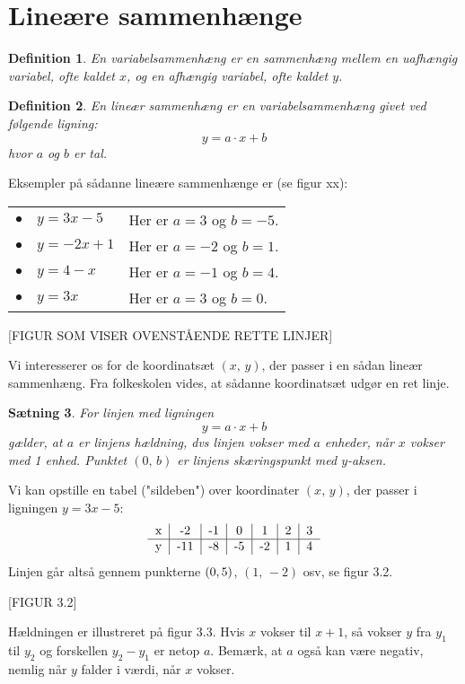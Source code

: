 \documentclass[12pt,oneside,a4paper]{article}
\newtheorem{thm}{Sætning}[section]
\newtheorem{mydef}[thm]{Definition}
\begin{document}
\section{Lineære sammenhænge}
\begin{mydef}
    En variabelsammenhæng er en sammenhæng mellem en uafhængig variabel, ofte
    kaldet $x$, og en afhængig variabel, ofte kaldet $y$.
\end{mydef}

\begin{mydef}
    En lineær sammenhæng er en variabelsammenhæng givet ved følgende ligning:
    $$
    y = a\cdot x + b
    $$
    hvor $a$ og $b$ er tal.
\end{mydef}

Eksempler på sådanne lineære sammenhænge er (se figur xx):

\begin{tabular}{ll}
    $\bullet\quad y=3x-5$  & Her er $a=3$ og $b=-5$. \\
    $\bullet\quad y=-2x+1$ & Her er $a=-2$ og $b=1$. \\
    $\bullet\quad y=4-x$   & Her er $a=-1$ og $b=4$. \\
    $\bullet\quad y=3x$    & Her er $a=3$ og $b=0$.
\end{tabular}

[FIGUR SOM VISER OVENSTÅENDE RETTE LINJER]

Vi interesserer os for de koordinatsæt $(x,\,y)$, der passer i en sådan lineær
sammenhæng. Fra folkeskolen vides, at sådanne koordinatsæt udgør en ret linje.

\begin{thm}
    For linjen med ligningen
    $$
    y = a\cdot x + b
    $$
    gælder, at $a$ er linjens hældning, dvs linjen vokser med $a$ enheder, når
    $x$ vokser med 1 enhed. Punktet $(0,\,b)$ er linjens skæringspunkt med
    $y$-aksen.
\end{thm}

Vi kan opstille en tabel ("sildeben") over koordinater $(x,\,y)$, der passer i
ligningen $y=3x-5$:
$$
\begin{tabular}{c|c|c|c|c|c|c}
    x &  -2 & -1 &  0 &  1 & 2 & 3 \\
    \hline
    y & -11 & -8 & -5 & -2 & 1 & 4
\end{tabular}
$$
Linjen går altså gennem punkterne $(0,\-5)$, $(1,\,-2)$ osv, se figur 3.2.

[FIGUR 3.2]

Hældningen er illustreret på figur 3.3. Hvis $x$ vokser til $x+1$, så vokser
$y$ fra $y_1$ til $y_2$ og forskellen $y_2-y_1$ er netop $a$. Bemærk, at $a$
også kan være negativ, nemlig når $y$ falder i værdi, når $x$ vokser.
\end{document}
